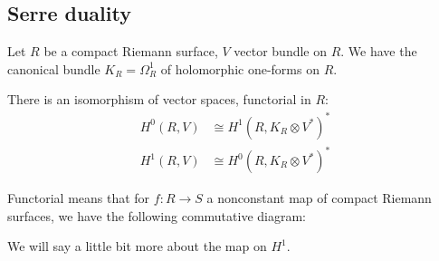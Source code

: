 \documentclass[12pt]{article}
\begin{document}
\subsection{Serre duality}
Let $R$ be a compact Riemann surface, $V$ vector bundle on $R$. We have the canonical bundle $K_R = \Omega_R^1$ of holomorphic one-forms on $R$.
\begin{theorem}
    There is an isomorphism of vector spaces, functorial in $R$:
    \begin{align*}
        H^0(R, V) & \cong H^1(R, K_R \otimes V^*)^* \\
        H^1(R, V) & \cong H^0(R, K_R \otimes V^*)^*
    \end{align*}
\end{theorem}
Functorial means that for $f: R \to S$ a nonconstant map of compact Riemann surfaces, we have the following commutative diagram:
\begin{center}
\end{center}
We will say a little bit more about the map on $H^1$.
\end{document}

